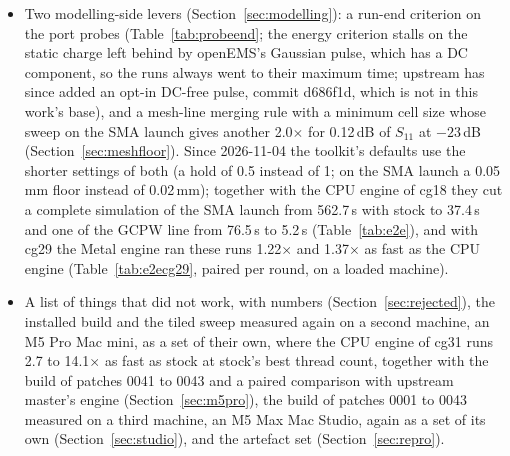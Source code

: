 \begin{itemize}
  A later build, cg31 (patches 0028--0039 of 2026-11-11, the installed build from that day to 2026-11-14), raises the Metal
  engine's rates on the six models by 1.07--1.53$\times$, which puts it ahead of the CPU engine on five of them and
  level on the patch tutorial (Section~\ref{sec:cg31}).
\item Two modelling-side levers (Section~\ref{sec:modelling}): a run-end criterion on the port probes
  (Table~\ref{tab:probeend}; the energy criterion stalls on the static charge left behind by openEMS's Gaussian pulse,
  which has a DC component, so the runs always went to their maximum time; upstream has since added an opt-in DC-free
  pulse, commit d686f1d, which is not in this work's base), and a mesh-line merging rule with a minimum cell size whose
  sweep on the SMA launch gives another 2.0$\times$ for 0.12\,dB of $S_{11}$ at $-23$\,dB (Section~\ref{sec:meshfloor}).
  Since 2026-11-04 the toolkit's defaults use the shorter settings of both (a hold of 0.5 instead of 1; on the SMA
  launch a 0.05\,mm floor instead of 0.02\,mm); together with
  the CPU engine of cg18 they cut a complete simulation of the SMA launch from 562.7\,s with stock to 37.4\,s and one
  of the GCPW line from 76.5\,s to 5.2\,s (Table~\ref{tab:e2e}), and with cg29 the Metal engine ran these runs
  1.22$\times$ and 1.37$\times$ as fast as the CPU engine (Table~\ref{tab:e2ecg29}, paired per round, on a loaded
  machine).
\item A list of things that did not work, with numbers (Section~\ref{sec:rejected}), the installed build and the
  tiled sweep measured again on a second machine, an M5 Pro Mac mini, as a set of their own, where the CPU engine of
  cg31 runs 2.7 to 14.1$\times$ as fast as stock at stock's best thread count, together with the build of patches 0041 to
  0043 and a paired comparison with upstream master's  engine (Section~\ref{sec:m5pro}), the build of patches 0001 to 0043 measured on a third
  machine, an M5 Max Mac Studio, again as a set of its own (Section~\ref{sec:studio}), and the artefact set (Section~\ref{sec:repro}).
\end{itemize}

